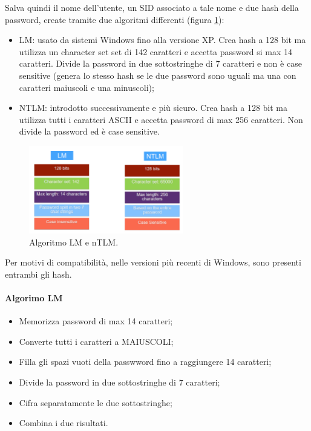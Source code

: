 \noindent Salva quindi il nome dell'utente, un SID associato a tale nome e due hash della password, create tramite due algoritmi differenti (figura \ref{fig:7-2}):
\begin{itemize}
    \item LM: usato da sistemi Windows fino alla versione XP. Crea hash a 128 bit ma utilizza un character set set di 142 caratteri e accetta password si max 14 caratteri. Divide la password in due sottostringhe di 7 caratteri e non è case sensitive (genera lo stesso hash se le due password sono uguali ma una con caratteri maiuscoli e una minuscoli);
    \item NTLM: introdotto successivamente e più sicuro. Crea hash a 128 bit ma utilizza tutti i caratteri ASCII e accetta password di max 256 caratteri. Non divide la password ed è case sensitive.
\end{itemize}

\begin{figure}
    \centering
    \includegraphics[width=0.6\textwidth]{images/7-2.png}
    \caption{Algoritmo LM e nTLM.}
    \label{fig:7-2}
\end{figure}

\noindent Per motivi di compatibilità, nelle versioni più recenti di Windows, sono presenti entrambi gli hash. 

\paragraph{Algorimo LM}
\begin{itemize}
    \item Memorizza password di max 14 caratteri;
    \item Converte tutti i caratteri a MAIUSCOLI;
    \item Filla gli spazi vuoti della passwword fino a raggiungere 14 caratteri;
    \item Divide la password in due sottostringhe di 7 caratteri;
    \item Cifra separatamente le due sottostringhe;
    \item Combina i due risultati.
\end{itemize}


